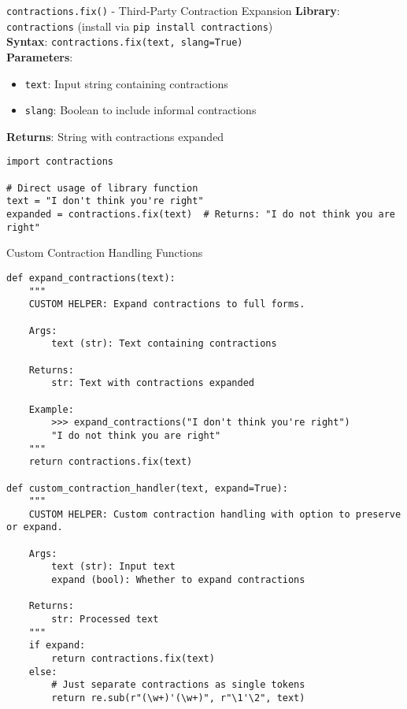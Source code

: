 \documentclass[11pt,a4paper]{article}
\begin{document}
\begin{nativebox}{\texttt{contractions.fix()} - Third-Party Contraction Expansion}
\textbf{Library}: \texttt{contractions} (install via \texttt{pip install contractions}) \\
\textbf{Syntax}: \texttt{contractions.fix(text, slang=True)} \\
\textbf{Parameters}:
\begin{itemize}
\item \texttt{text}: Input string containing contractions
\item \texttt{slang}: Boolean to include informal contractions
\end{itemize}

\textbf{Returns}: String with contractions expanded

\begin{lstlisting}[caption=Direct contraction expansion]
import contractions

# Direct usage of library function
text = "I don't think you're right"
expanded = contractions.fix(text)  # Returns: "I do not think you are right"
\end{lstlisting}
\end{nativebox}

\begin{custombox}{Custom Contraction Handling Functions}

\begin{lstlisting}[caption=Custom contraction processing helpers]
def expand_contractions(text):
    """
    CUSTOM HELPER: Expand contractions to full forms.
    
    Args:
        text (str): Text containing contractions
        
    Returns:
        str: Text with contractions expanded
        
    Example:
        >>> expand_contractions("I don't think you're right")
        "I do not think you are right"
    """
    return contractions.fix(text)

def custom_contraction_handler(text, expand=True):
    """
    CUSTOM HELPER: Custom contraction handling with option to preserve or expand.
    
    Args:
        text (str): Input text
        expand (bool): Whether to expand contractions
        
    Returns:
        str: Processed text
    """
    if expand:
        return contractions.fix(text)
    else:
        # Just separate contractions as single tokens
        return re.sub(r"(\w+)'(\w+)", r"\1'\2", text)
\end{lstlisting}
\end{custombox}
\end{document}
